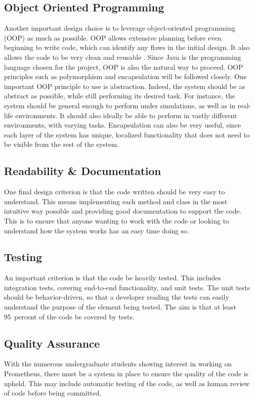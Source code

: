 \documentclass[titlepage,11pt]{article}
\begin{document}
\subsection{Object Oriented Programming}
Another important design choice is to leverage object-oriented programming (OOP) as much as possible. OOP allows extensive planning before even beginning to write code, which can identify any flaws in the initial design. It also allows the code to be very clean and reusable \cite{oop}. Since Java is the programming language chosen for the project, OOP is also the natural way to proceed.  OOP principles such as polymorphism and encapsulation will be followed closely. One important OOP principle to use is abstraction. Indeed, the system should be as abstract as possible, while still performing its desired task. For instance, the system should be general enough to perform under simulations, as well as in real-life environments. It should also ideally be able to perform in vastly different environments, with varying tasks. Encapsulation can also be very useful, since each layer of the system has unique, localized functionality that does not need to be visible from the rest of the system.

\subsection{Readability \& Documentation}
One final design criterion is that the code written should be very easy to understand. This means implementing each method and class in the most intuitive way possible and providing good documentation to support the code. This is to ensure that anyone wanting to work with the code or looking to understand how the system works has an easy time doing so.

\subsection{Testing}
An important criterion is that the code be heavily tested. This includes integration tests, covering end-to-end functionality, and unit tests. The unit tests should be behavior-driven, so that a developer reading the tests can easily understand the purpose of the element being tested. The aim is that at least \SI{95}{percent} of the code be covered by tests.

\subsection{Quality Assurance}
With the numerous undergraduate students showing interest in working on Prometheus, there must be a system in place to ensure the quality of the code is upheld. This may include automatic testing of the code, as well as human review of code before being committed.
\end{document}
